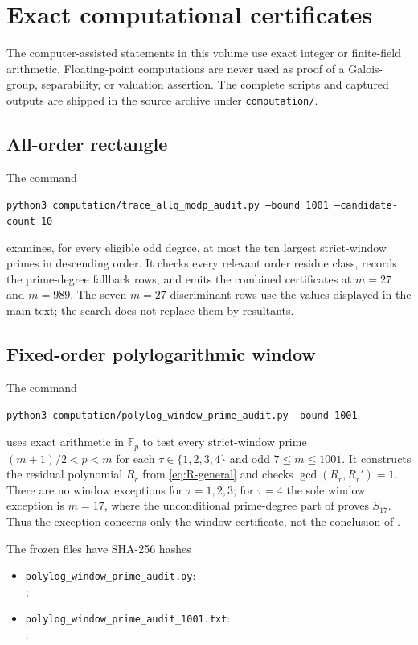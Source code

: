 \documentclass[11pt]{article}
\theoremstyle{keio}
\theoremstyle{definition}
\theoremstyle{remark}
\newcommand{\F}{\mathbb F}
\begin{document}
\section{Exact computational certificates}
\label{app:computational-certificates}

The computer-assisted statements in this volume use exact integer or
finite-field arithmetic.  Floating-point computations are never used as
proof of a Galois-group, separability, or valuation assertion.  The complete
scripts and captured outputs are shipped in the source archive under
\nolinkurl{computation/}.

\subsection{All-order rectangle}

The command
\begin{center}
\texttt{python3 computation/trace\_allq\_modp\_audit.py
  --bound 1001 --candidate-count 10}
\end{center}
examines, for every eligible odd degree, at most the ten largest
strict-window primes in descending order.  It checks every relevant order
residue class, records the prime-degree fallback rows, and emits the combined
certificates at \(m=27\) and \(m=989\).  The seven \(m=27\) discriminant
rows use the values displayed in the main text; the search does not replace
them by resultants.

\subsection{Fixed-order polylogarithmic window}

The command
\begin{center}
\texttt{python3 computation/polylog\_window\_prime\_audit.py
  --bound 1001}
\end{center}
uses exact arithmetic in $\F_p$ to test every strict-window prime
$(m+1)/2<p<m$ for each $\tau\in\{1,2,3,4\}$ and odd
$7\le m\le1001$.  It constructs the residual polynomial $R_r$ from
\eqref{eq:R-general} and checks $\gcd(R_r,R_r')=1$.  There are no window
exceptions for $\tau=1,2,3$; for $\tau=4$ the sole window exception is
$m=17$, where the unconditional prime-degree part of
 proves $S_{17}$.  Thus the exception concerns only
the window certificate, not the conclusion of .

The frozen files have SHA-256 hashes
\begin{itemize}
\item \nolinkurl{polylog_window_prime_audit.py}:\\
\texttt{\small{}};
\item \nolinkurl{polylog_window_prime_audit_1001.txt}:\\
\texttt{\small{}}.
\end{itemize}
\end{document}
